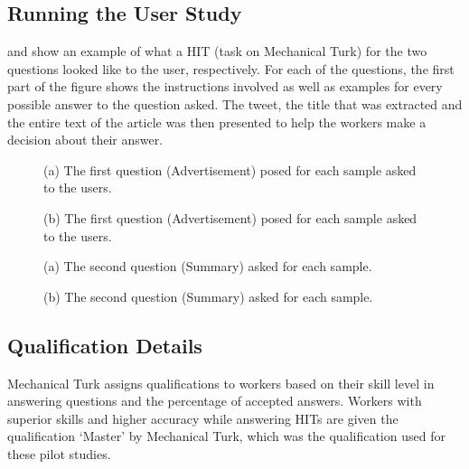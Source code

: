 \subsection{Running the User Study}

 and  show an example of what a HIT (task on Mechanical Turk) for the two questions looked like to the user, respectively. For each of the questions, the first part of the figure shows the instructions involved as well as examples for every possible answer to the question asked. The tweet, the title that was extracted and the entire text of the article was then presented to help the workers make a decision about their answer.  

\begin{figure}[!htbp]
  \centering 
  \subfloat{\texttt{[image: q11]}}
  \caption[User study question 1 example]{(a) The first question (Advertisement) posed for each sample asked to the users.}
  \label{fig:q1}
\end{figure}

\begin{figure}[!htbp]
  \ContinuedFloat 
  \centering 
  \subfloat{\texttt{[image: q12]}}%
  \caption[]{(b) The first question (Advertisement) posed for each sample asked to the users.}
  \label{fig:q12}
\end{figure} 

\begin{figure}[!htbp]
  \centering 
  \subfloat{\texttt{[image: q21]}}
  \caption[User study question 2 example]{(a) The second question (Summary) asked for each sample.}
  \label{fig:q2}
\end{figure}

\begin{figure}[!htbp]
  \ContinuedFloat 
  \centering 
  \subfloat{\texttt{[image: q22]}}%
  \caption[]{(b) The second question (Summary) asked for each sample.}
  \label{fig:q22}
\end{figure} 

\subsection{Qualification Details}

Mechanical Turk assigns qualifications to workers based on their skill level in answering questions and the percentage of accepted answers. Workers with superior skills and higher accuracy while answering HITs are given the qualification `Master' by Mechanical Turk, which was the qualification used for these pilot studies.

